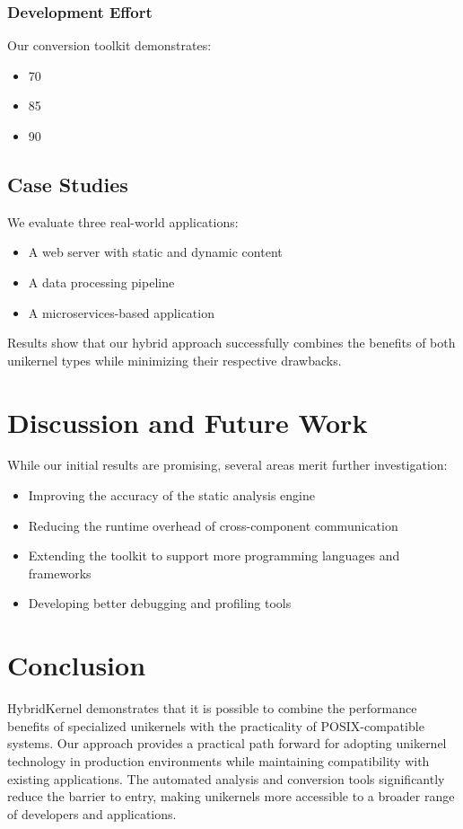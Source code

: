 \documentclass[conference]{IEEEtran}
\begin{document}
\subsubsection{Development Effort}
Our conversion toolkit demonstrates:
\begin{itemize}
	\item 70%
	\item 85%
	\item 90%
\end{itemize}

\subsection{Case Studies}
We evaluate three real-world applications:
\begin{itemize}
	\item A web server with static and dynamic content
	\item A data processing pipeline
	\item A microservices-based application
\end{itemize}

Results show that our hybrid approach successfully combines the benefits of both unikernel types while minimizing their respective drawbacks.

\section{Discussion and Future Work}
While our initial results are promising, several areas merit further investigation:
\begin{itemize}
	\item Improving the accuracy of the static analysis engine
	\item Reducing the runtime overhead of cross-component communication
	\item Extending the toolkit to support more programming languages and frameworks
	\item Developing better debugging and profiling tools
\end{itemize}

\section{Conclusion}
HybridKernel demonstrates that it is possible to combine the performance benefits of specialized unikernels with the practicality of POSIX-compatible systems. Our approach provides a practical path forward for adopting unikernel technology in production environments while maintaining compatibility with existing applications. The automated analysis and conversion tools significantly reduce the barrier to entry, making unikernels more accessible to a broader range of developers and applications.


\end{document}
